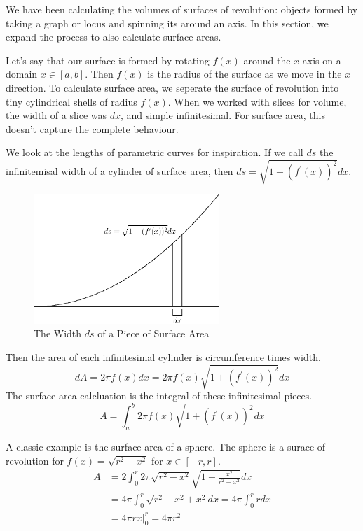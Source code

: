 \documentclass[fleqn]{report}
\begin{document}
We have been calculating the volumes of surfaces of
revolution: objects formed by taking a graph or locus and
spinning its around an axis. In this section, we expand the
process to also calculate surface areas.

Let's say that our surface is formed by rotating $f(x)$ around
the $x$ axis on a domain $x \in [a,b]$. Then $f(x)$ is the
radius of the surface as we move in the $x$ direction. To
calculate surface area, we seperate the surface of revolution
into tiny cylindrical shells of radius $f(x)$. When we worked
with slices for volume, the width of a slice was $dx$, and
simple infinitesimal. For surface area, this doesn't capture
the complete behaviour. 

We look at the lengths of parametric curves for inspiration.
If we call $ds$ the infinitemisal width of a cylinder of
surface area, then $ds = \sqrt{ 1 + (f^\prime(x))^2}dx$. 

\begin{figure}[h]
\centering
\includegraphics[width=7cm]{figure25.eps}
\caption{The Width $ds$ of a Piece of Surface Area}
\label{figure-piece-surface-area}
\end{figure}

Then the area of each infinitesimal cylinder is circumference
times width. 
\begin{equation*}
dA = 2\pi f(x) dx = 2\pi f(x) \sqrt{ 1 + (f^\prime(x))^2} dx
\end{equation*}
The surface area calcluation is the integral of these
infinitesimal pieces.
\begin{equation*} 
A = \int_a^b 2\pi f(x) \sqrt{1 + (f^\prime(x))^2} dx 
\end{equation*}

\begin{example}
A classic example is the surface area of a sphere. The sphere
is a surace of revolution for $f(x) = \sqrt{r^2-x^2}$ for $x
\in [-r,r]$. 
\begin{align*}
A & = 2 \int_0^r 2\pi \sqrt{r^2-x^2} \sqrt{ 1+ \frac{x^2}{r^2 -
x^2}} dx \\
& = 4 \pi \int_0^r \sqrt{ r^2 - x^2 + x^2} dx = 4\pi
\int_0^r r dx \\
& = \left. 4 \pi r x \right|_0^r = 4 \pi r^2
\end{align*}
\end{example}
\end{document}
